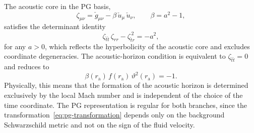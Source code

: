 \documentclass[12pt,a4paper,preprint]{elsarticle}
\begin{document}
            The acoustic core in the PG basis,
            \begin{equation}
                \zeta_{\mu\nu} = \check{g}_{\mu\nu} - \beta\,\check{u}_{\mu}\,\check{u}_{\nu}, \qquad \beta = a^{2} - 1,
                \label{eq:acoustic-core-pg}
            \end{equation}
            satisfies the determinant identity
            \begin{equation}
                \zeta_{\check{t}\check{t}}\,\zeta_{rr} - \zeta_{\check{t}r}^{\,2} = -a^{2},
                \label{eq:determinant-identity}
            \end{equation}
            for any $a > 0$, which reflects the hyperbolicity of the acoustic core and excludes coordinate degeneracies. The acoustic-horizon condition is equivalent to $\zeta_{\check{t}\check{t}} = 0$ and reduces to~\cite{SemyannikovAV_GlobalAcousticGeometryOfMichelFlowInPainleveGullstrandCoordinates_2026}
            \begin{equation}
                \beta(r_{\mathrm{a}})\,f(r_{\mathrm{a}})\,\vartheta^{2}(r_{\mathrm{a}}) = -1.
                \label{eq:horizon-condition-pg}
            \end{equation}
            Physically, this means that the formation of the acoustic horizon is determined exclusively by the local Mach number and is independent of the choice of the time coordinate. The PG representation is regular for both branches, since the transformation~\eqref{eq:pg-transformation} depends only on the background Schwarzschild metric and not on the sign of the fluid velocity.
\end{document}

